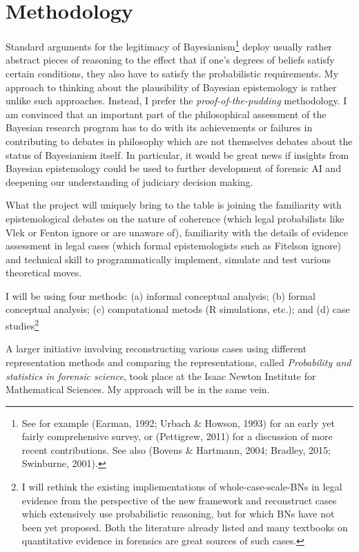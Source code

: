 \documentclass[11pt,dvipsnames,enabledeprecatedfontcommands]{scrartcl}
\begin{document}
\hypertarget{methodology}{%
\section{Methodology}\label{methodology}}

Standard arguments for the legitimacy of Bayesianism\footnote{See for
  example (Earman, 1992; Urbach \& Howson, 1993) for an early yet fairly
  comprehensive survey, or (Pettigrew, 2011) for a discussion of more
  recent contributions. See also (Bovens \& Hartmann, 2004; Bradley,
  2015; Swinburne, 2001).} deploy usually rather abstract pieces of
reasoning to the effect that if one's degrees of beliefs satisfy certain
conditions, they also have to satisfy the probabilistic requirements. My
approach to thinking about the plausibility of Bayesian epistemology is
rather unlike such approaches. Instead, I prefer the
\emph{proof-of-the-pudding} methodology. I am convinced that an
important part of the philosophical assessment of the Bayesian research
program has to do with its achievements or failures in contributing to
debates in philosophy which are not themselves debates about the status
of Bayesianism itself. In particular, it would be great news if insights
from Bayesian epistemology could be used to further development of
forensic AI and deepening our understanding of judiciary decision
making.

What the project will uniquely bring to the table is joining the
familiarity with epistemological debates on the nature of coherence
(which legal probabilists like Vlek or Fenton ignore or are unaware of),
familiarity with the details of evidence assessment in legal cases
(which formal epistemologists such as Fitelson ignore) and technical
skill to programmatically implement, simulate and test various
theoretical moves.

I will be using four methods: (a) informal conceptual analysis; (b)
formal conceptual analysis; (c) computational metods (R simulations,
etc.); and (d) case
studies\footnote{I will rethink the existing impliementations of whole-case-scale-BNs in legal evidence from the perspective of the new framework and reconstruct cases which extensively use probabilistic reasoning, but for which BNs have not been yet proposed. Both the literature already listed and many textbooks on quantitative evidence in forensics are great sources of such cases.}

A larger initiative involving reconstructing various cases using
different representation methods and comparing the representations,
called \emph{Probability and statistics in forensic science}, took place
at the Isaac Newton Institute for Mathematical Sciences. My approach
will be in the same vein.
\end{document}
